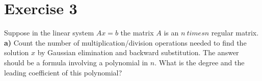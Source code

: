 \documentclass{article}
\begin{document}
\section*{Exercise 3}
Suppose in the linear system $Ax = b$ the matrix $A$ is an $n \
times n$ regular matrix. \\
{\bf a)} Count the number of multiplication/division operations
needed to find the solution $x$ by Gaussian elimination and backward substitution.
The answer should be a formula involving a polynomial in $n$.
What is the degree and the leading coefficient of this polynomial? \\
\end{document}

